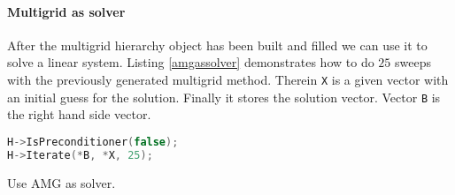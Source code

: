 \paragraph{Multigrid as solver}
After the multigrid hierarchy object has been built and filled we can use it to solve a linear system.
Listing \ref{amgassolver} demonstrates how to do $25$ sweeps with the previously generated multigrid method. Therein \verb|X| is a given vector with an initial guess for the solution. Finally it stores the solution vector. Vector \verb|B| is the right hand side vector.
\begin{Listing}
\begin{center}
\begin{lstlisting}[language=C++,label=listing:AmgAsSolver]
H->IsPreconditioner(false);
H->Iterate(*B, *X, 25);
\end{lstlisting}
\caption{Use AMG as solver.}
\label{listing:amgassolver}
\end{center}
\end{Listing}


